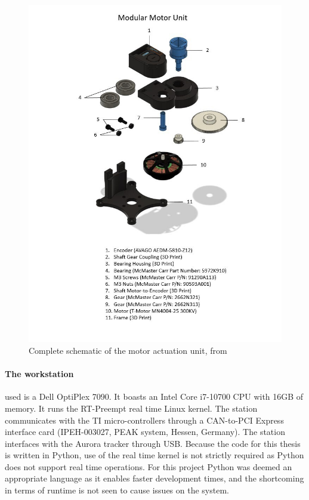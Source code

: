 \begin{figure}[p]
    \centering
    \includegraphics[width=\textwidth]{images/motor_unit.jpg}
    \caption{Complete schematic of the motor actuation unit, from \cite{motor_actuation_paper}}
    \label{fig:motor_unit}
\end{figure}

\paragraph{The workstation} used is a Dell OptiPlex 7090. It boasts an Intel Core i7-10700 CPU with 16GB of memory. It runs the RT-Preempt real time Linux kernel. The station communicates with the TI micro-controllers through a CAN-to-PCI Express interface card (IPEH-003027, PEAK system, Hessen, Germany). The station interfaces with the Aurora tracker through USB. Because the code for this thesis is written in Python, use of the real time kernel is not strictly required as Python does not support real time operations. For this project Python was deemed an appropriate language as it enables faster development times, and the shortcoming in terms of runtime is not seen to cause issues on the system. 

